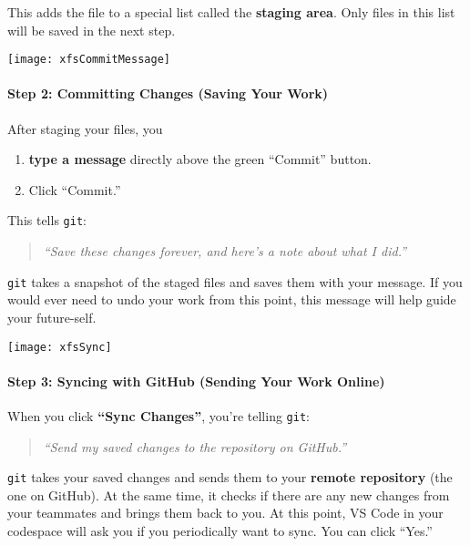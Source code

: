 \documentclass{ximera}
\begin{document}
    This adds the file to a special list called the \textbf{staging area}. Only
    files in this list will be saved in the next step.

\pdfOnly{\end{multicols}}

\newpage

\begin{image}
    \texttt{[image: xfsCommitMessage]}
\end{image}
    \paragraph{Step 2: Committing Changes (Saving Your Work)}

    After staging your files, you
    \begin{enumerate}
        \item \textbf{type a message} directly above the green ``Commit''
              button.
        \item Click ``Commit.''
    \end{enumerate}
    This tells \verb!git!:
    \begin{quote}
        \emph{``Save these changes forever, and here's a note about what I
            did.''}
    \end{quote}
    \verb!git! takes a snapshot of the staged files and saves them with your message.
    If you would ever need to undo your work from this point, this message will
    help guide your future-self.
\pdfOnly{\end{multicols}}

\newpage

\begin{image}
    \texttt{[image: xfsSync]}
\end{image}
\paragraph{Step 3: Syncing with GitHub (Sending Your Work Online)}
When you click \textbf{``Sync Changes''}, you're telling \verb!git!:
\begin{quote}
    \emph{``Send my saved changes to the repository on GitHub.''}
\end{quote}
\verb!git! takes your saved changes and sends them to your \textbf{remote
    repository}
(the one on GitHub). At the same time, it checks if there are any new
changes from your teammates and brings them back to you. At this point,
VS Code in your codespace will ask you if you periodically want to sync.
You can click ``Yes.''
\pdfOnly{\end{multicols}}
\end{document}
